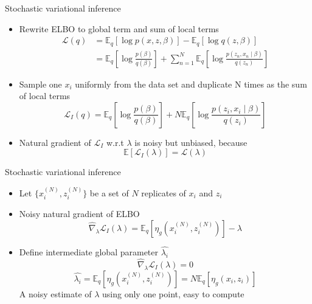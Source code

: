 \documentclass[aspectratio=169]{beamer}
\begin{document}
\begin{frame}{Stochastic variational inference}
    \begin{itemize}
        \item Rewrite ELBO to global term and sum of local terms
        \begin{align*}
            \mathcal{L}(q) &= \mathbb{E}_q[\log p(x,z,\beta)] - \mathbb{E}_q[\log q(z,\beta)]\\
            &= \mathbb{E}_q[\log \frac{p(\beta)}{q(\beta)}] + \sum\limits_{n=1}^N \mathbb{E}_q[\log \frac{p(z_n, x_n \mid \beta)}{q(z_n)}]
        \end{align*}
        \item Sample one $x_i$ uniformly from the data set and duplicate N times as the sum of local terms
        \[\mathcal{L}_I(q) = \mathbb{E}_q[\log \frac{p(\beta)}{q(\beta)}] + N \mathbb{E}_q[\log \frac{p(z_i, x_i \mid \beta)}{q(z_i)}]\]
        \item Natural gradient of $\mathcal{L}_I$ w.r.t $\lambda$ is noisy but unbiased, because %
        \[\mathbb{E}[\mathcal{L}_I(\lambda)] = \mathcal{L}(\lambda)\]
    \end{itemize}
\end{frame}

\begin{frame}{Stochastic variational inference}
    \begin{itemize}
        \item Let $\{x_i^{(N)}, z_i^{(N)}\}$ be a set of $N$ replicates of $x_i$ and $z_i$
        \item Noisy natural gradient of ELBO
        \[\hat{\nabla}_{\lambda}\mathcal{L}_I(\lambda) = \mathbb{E}_q[\eta_g(x_i^{(N)}, z_i^{(N)})] - \lambda\]
        \item Define intermediate global parameter $\hat{\lambda_i}$
        \[\hat{\nabla}_{\lambda}\mathcal{L}_I(\lambda) = 0\]
        \[\hat{\lambda_i} = \mathbb{E}_q[\eta_g(x_i^{(N)}, z_i^{(N)})] = N\mathbb{E}_q[\eta_g(x_i, z_i)]\]
        A noisy estimate of $\lambda$ using only one point, easy to compute
        
    \end{itemize}
\end{frame}
\end{document}
